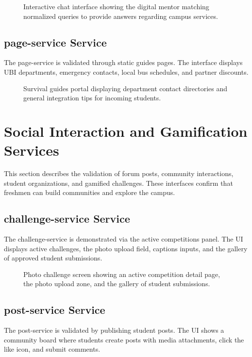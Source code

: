 \documentclass[12pt]{article}
\begin{document}
\begin{figure}[htbp]
    \centering
    \caption{Interactive chat interface showing the digital mentor matching normalized queries to provide answers regarding campus services.}
    \label{fig:chatbot_chat}
\end{figure}

\subsection{page-service Service}
The page-service is validated through static guides pages. The interface displays UBI departments, emergency contacts, local bus schedules, and partner discounts.

\begin{figure}[htbp]
    \centering
    \caption{Survival guides portal displaying department contact directories and general integration tips for incoming students.}
    \label{fig:info_guides}
\end{figure}

\section{Social Interaction and Gamification Services}
This section describes the validation of forum posts, community interactions, student organizations, and gamified challenges. These interfaces confirm that freshmen can build communities and explore the campus.

\subsection{challenge-service Service}
The challenge-service is demonstrated via the active competitions panel. The UI displays active challenges, the photo upload field, captions inputs, and the gallery of approved student submissions.

\begin{figure}[htbp]
    \centering
    \caption{Photo challenge screen showing an active competition detail page, the photo upload zone, and the gallery of student submissions.}
    \label{fig:challenges_ui}
\end{figure}

\subsection{post-service Service}
The post-service is validated by publishing student posts. The UI shows a community board where students create posts with media attachments, click the like icon, and submit comments.
\end{document}
